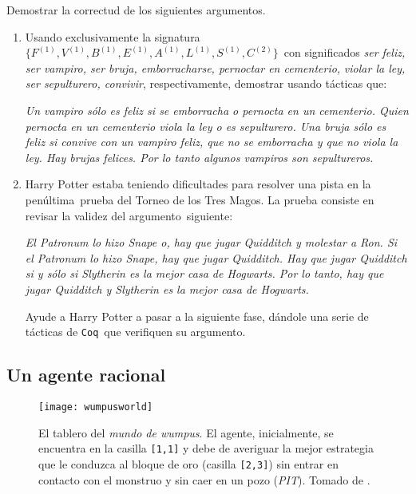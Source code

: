 \documentclass[paper=letter, fontsize=12pt]{scrartcl}
\begin{document}
\noindent
Demostrar la correctud de los siguientes argumentos.

\begin{enumerate}[resume]
\item Usando exclusivamente la signatura $\{F^{(1)}, V^{(1)}, B^{(1)}, E^{(1)}, A^{(1)}, L^{(1)}, S^{(1)}, C^{(2)}\}$\
  con significados \textit{ser feliz, ser vampiro, ser bruja, emborracharse, pernoctar en cementerio,}
  \textit{violar la ley, ser sepulturero, convivir}, respectivamente, demostrar usando tácticas que:
  \begin{center}
    \textit{
      Un vampiro sólo es feliz si se emborracha o pernocta en un cementerio. Quien pernocta en un
      cementerio viola la ley o es sepulturero. Una bruja sólo es feliz si convive con un vampiro feliz,
      que no se emborracha y que no viola la ley. Hay brujas felices. Por lo tanto algunos vampiros
      son sepultureros.
    }
  \end{center}
\item Harry Potter estaba teniendo dificultades para resolver una pista en la penúltima\
  prueba del Torneo de los Tres Magos. La prueba consiste en revisar la validez del argumento\
  siguiente:
    \begin{center}
      \textit{
        El Patronum lo hizo Snape o, hay que jugar Quidditch y molestar a Ron. Si el
        Patronum lo hizo Snape, hay que jugar Quidditch. Hay que jugar Quidditch si y sólo si
        Slytherin es la mejor casa de Hogwarts. Por lo tanto, hay que jugar Quidditch y Slytherin
        es la mejor casa de Hogwarts.
      }
    \end{center}
    Ayude a Harry Potter a pasar a la siguiente fase, dándole una serie de tácticas de \verb+Coq+\
    que verifiquen su argumento.
\end{enumerate}

\subsection{Un agente racional}

\begin{figure}[h]
  \centering
  \texttt{[image: wumpusworld]}
  \caption[CAPTION WUMPUS]{
    El tablero del \emph{mundo de wumpus}. El agente, inicialmente, se encuentra en la
    casilla \texttt{[1,1]} y debe de averiguar la mejor estrategia que le conduzca al
    bloque de oro (casilla \texttt{[2,3]}) sin entrar en contacto con el monstruo y
    sin caer en un pozo (\emph{PIT}). Tomado de \footnotemark.
  }
  \label{wumpusfig}
\end{figure}
\end{document}
